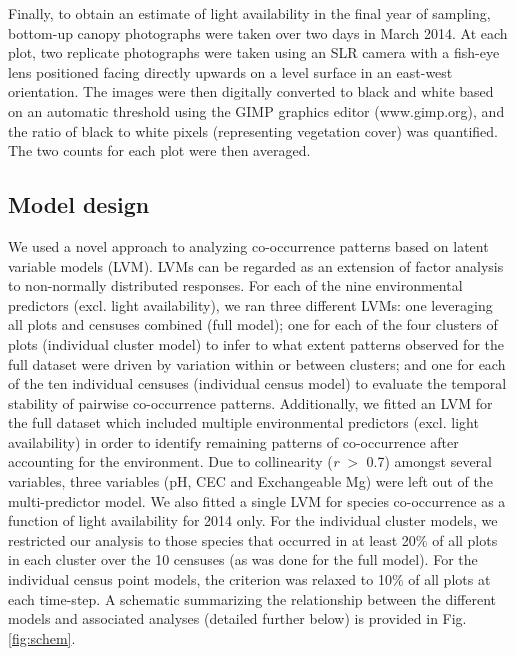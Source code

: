 Finally, to obtain an estimate of light availability in the final year of sampling, bottom-up canopy photographs were taken over two days in March 2014. At each plot, two replicate photographs were taken using an SLR camera with a fish-eye lens positioned facing directly upwards on a level surface in an east-west orientation. The images were then digitally converted to black and white based on an automatic threshold using the GIMP graphics editor (www.gimp.org), and the ratio of black to white pixels (representing vegetation cover) was quantified.  The two counts for each plot were then averaged.

\subsection{Model design}

We used a novel approach to analyzing co-occurrence patterns based on latent variable models (LVM). LVMs can be regarded as an extension of factor analysis \citep{knott1999} to non-normally distributed responses. For each of the nine environmental predictors (excl. light availability), we ran three different LVMs: one leveraging all plots and censuses combined (full model); one for each of the four clusters of plots (individual cluster model) to infer to what extent patterns observed for the full dataset were driven by variation within or between clusters; and one for each of the ten individual censuses (individual census model) to evaluate the temporal stability of pairwise co-occurrence patterns. Additionally, we fitted an LVM for the full dataset which included multiple environmental predictors (excl. light availability) in order to identify remaining patterns of co-occurrence after accounting for the environment. Due to collinearity (\textit{r}  $>$ 0.7) amongst several variables, three variables (pH, CEC and Exchangeable Mg) were left out of the multi-predictor model. We also fitted a single LVM for species co-occurrence as a function of light availability for 2014 only. For the individual cluster models, we restricted our analysis to those species that occurred in at least 20\% of all plots in each cluster over the 10 censuses (as was done for the full model). For the individual census point models, the criterion was relaxed to 10\% of all plots at each time-step. A schematic summarizing the relationship between the different models and associated analyses (detailed further below) is provided in Fig. \ref{fig:schem}.

